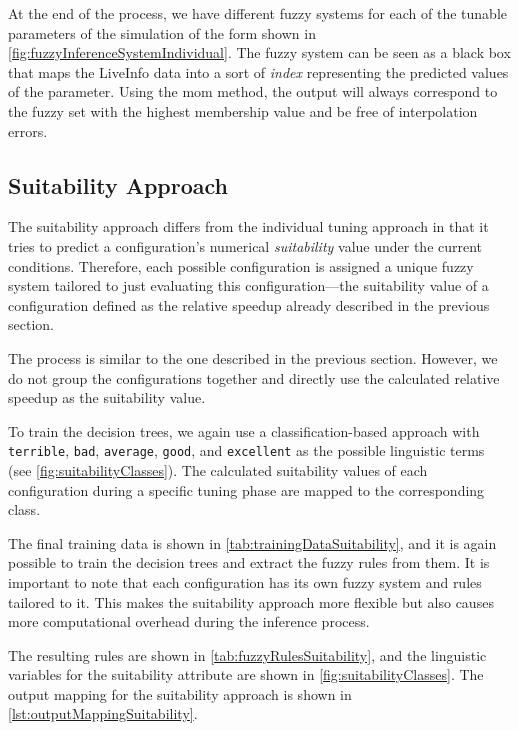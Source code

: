 At the end of the process, we have different fuzzy systems for each of the tunable parameters of the simulation of the form shown in \autoref{fig:fuzzyInferenceSystemIndividual}. The fuzzy system can be seen as a black box that maps the LiveInfo data into a sort of \emph{index} representing the predicted values of the parameter. Using the \gls{mom} method, the output will always correspond to the fuzzy set with the highest membership value and be free of interpolation errors.


\subsection{Suitability Approach}

The suitability approach differs from the individual tuning approach in that it tries to predict a configuration's numerical \emph{suitability} value under the current conditions. Therefore, each possible configuration is assigned a unique fuzzy system tailored to just evaluating this configuration—the suitability value of a configuration defined as the relative speedup already described in the previous section.

The process is similar to the one described in the previous section. However, we do not group the configurations together and directly use the calculated relative speedup as the suitability value.

To train the decision trees, we again use a classification-based approach with \texttt{terrible}, \texttt{bad}, \texttt{average}, \texttt{good}, and \texttt{excellent} as the possible linguistic terms (see \autoref{fig:suitabilityClasses}). The calculated suitability values of each configuration during a specific tuning phase are mapped to the corresponding class.

The final training data is shown in \autoref{tab:trainingDataSuitability}, and it is again possible to train the decision trees and extract the fuzzy rules from them. It is important to note that each configuration has its own fuzzy system and rules tailored to it. This makes the suitability approach more flexible but also causes more computational overhead during the inference process.

The resulting rules are shown in \autoref{tab:fuzzyRulesSuitability}, and the linguistic variables for the suitability attribute are shown in \autoref{fig:suitabilityClasses}. The output mapping for the suitability approach is shown in \autoref{lst:outputMappingSuitability}.

